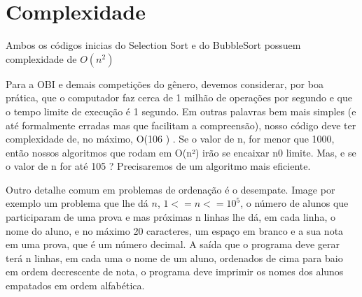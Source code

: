 \section{Complexidade}

Ambos os códigos inicias do Selection Sort e do BubbleSort possuem complexidade de $O(n^2)$

Para a OBI e demais competições do gênero, devemos considerar, por boa prática, que o computador faz cerca de 1 milhão de operações por segundo e que o tempo limite de execução é  1 segundo. Em outras palavras bem mais simples (e até formalmente erradas mas que facilitam a compreensão), nosso código deve ter complexidade de, no máximo, O(106
) . Se o valor de n, for menor que 1000, então nossos algoritmos que rodam em O(n²) irão se encaixar n0 limite. Mas, e se o valor de n for até 105
? Precisaremos de um algoritmo mais eficiente.

Outro detalhe comum em problemas de ordenação é o desempate. Image por exemplo um problema que lhe dá $n$, $1 <= n <=10^5$, o número de alunos que participaram de uma prova e
mas próximas n linhas lhe dá, em cada linha, o nome do aluno, e no máximo 20 caracteres, um espaço em branco e a sua nota em uma prova, que é um 
número decimal. A saída que o programa deve gerar terá n linhas, em cada uma o nome de um aluno, ordenados de cima para baio em ordem decrescente de nota, o programa deve imprimir os nomes dos alunos empatados em ordem alfabética.
